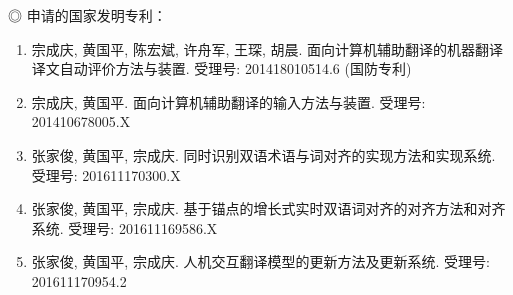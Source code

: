 \pagebreak[4]

\noindent ◎ 申请的国家发明专利：

\begin{enumerate}[(1)]
	\item 宗成庆, 黄国平, 陈宏斌, 许舟军, 王琛, 胡晨. 面向计算机辅助翻译的机器翻译译文自动评价方法与装置. 受理号: 201418010514.6 (国防专利)
	
	\item 宗成庆, 黄国平. 面向计算机辅助翻译的输入方法与装置. 受理号: 201410678005.X
	
	\item 张家俊, 黄国平, 宗成庆. 同时识别双语术语与词对齐的实现方法和实现系统. 受理号: 201611170300.X
	
	\item 张家俊, 黄国平, 宗成庆. 基于锚点的增长式实时双语词对齐的对齐方法和对齐系统. 受理号: 201611169586.X
	
	\item 张家俊, 黄国平, 宗成庆. 人机交互翻译模型的更新方法及更新系统. 受理号: 201611170954.2	
\end{enumerate}